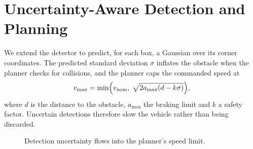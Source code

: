 \chapter{Uncertainty-Aware Detection and Planning}
\label{ch:method}

We extend the detector to predict, for each box, a Gaussian over its corner coordinates. The
predicted standard deviation $\sigma$ inflates the obstacle when the planner checks for
collisions, and the planner caps the commanded speed at
\begin{equation}
  v_{\max} = \min\Bigl(v_{\mathrm{nom}},\; \sqrt{2 a_{\max} (d - k\sigma)}\Bigr),
  \label{eq:speed}
\end{equation}
where $d$ is the distance to the obstacle, $a_{\max}$ the braking limit and $k$ a safety
factor. Uncertain detections therefore slow the vehicle rather than being discarded.

\begin{figure}[htbp]
  \centering
  \caption{Detection uncertainty flows into the planner's speed limit.}
  \label{fig:loop}
\end{figure}
